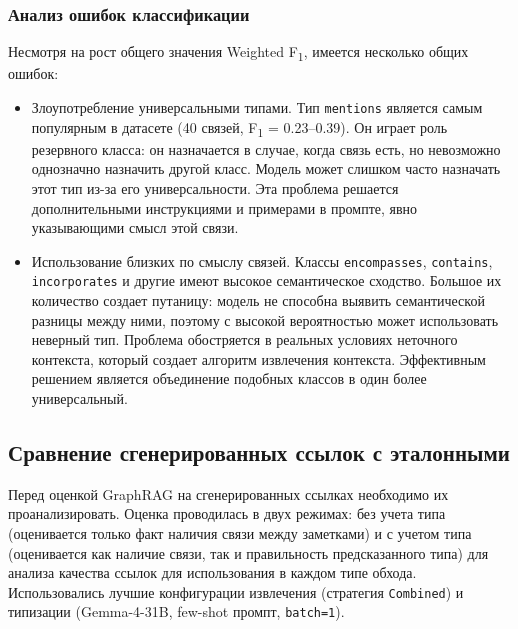 \subsubsection*{Анализ ошибок классификации}
Несмотря на рост общего значения Weighted F\textsubscript{1},
имеется несколько общих ошибок:
\begin{itemize}
    \item Злоупотребление универсальными типами.
          Тип \texttt{mentions} является самым популярным в датасете
          (40 связей, F\textsubscript{1} = 0.23--0.39).
          Он играет роль резервного класса:
          он назначается в случае,
          когда связь есть, но невозможно однозначно назначить другой класс.
          Модель может слишком часто назначать этот тип из-за его универсальности.
          Эта проблема решается дополнительными инструкциями и примерами в промпте,
          явно указывающими смысл этой связи.
    \item Использование близких по смыслу связей.
          Классы \texttt{encompasses}, \texttt{contains}, \texttt{incorporates} и другие
          имеют высокое семантическое сходство.
          Большое их количество создает путаницу:
          модель не способна выявить семантической разницы между ними,
          поэтому с высокой вероятностью может использовать неверный тип.
          Проблема обостряется в реальных условиях неточного контекста,
          который создает алгоритм извлечения контекста.
          Эффективным решением является объединение
          подобных классов в один более универсальный.
\end{itemize}

\subsection{Сравнение сгенерированных ссылок с эталонными}

Перед оценкой GraphRAG на сгенерированных ссылках необходимо их проанализировать.
Оценка проводилась в двух режимах: без учета типа (оценивается только факт наличия связи между заметками)
и с учетом типа (оценивается как наличие связи, так и правильность предсказанного типа)
для анализа качества ссылок для использования в каждом типе обхода.
Использовались лучшие конфигурации извлечения (стратегия \texttt{Combined}) и типизации
(Gemma-4-31B, few-shot промпт, \texttt{batch=1}).

